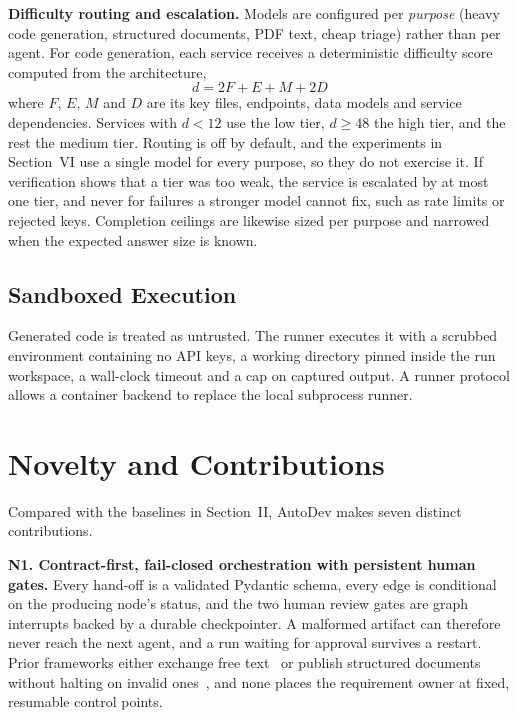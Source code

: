 \documentclass[conference,letterpaper]{IEEEtran}
\begin{document}
\textbf{Difficulty routing and escalation.} Models are configured per
\emph{purpose} (heavy code generation, structured documents, PDF text, cheap
triage) rather than per agent. For code generation, each service receives a
deterministic difficulty score computed from the architecture,
\begin{equation}
d = 2F + E + M + 2D
\label{eq:difficulty}
\end{equation}
where $F$, $E$, $M$ and $D$ are its key files, endpoints, data models and service
dependencies. Services with $d<12$ use the low tier, $d\ge48$ the high tier,
and the rest the medium tier. Routing is off by default, and the experiments in
Section~VI use a single model for every purpose, so they do not exercise it. If verification shows that a tier was too weak, the
service is escalated by at most one tier, and never for failures a stronger model
cannot fix, such as rate limits or rejected keys. Completion ceilings are likewise
sized per purpose and narrowed when the expected answer size is known.

\subsection{Sandboxed Execution}
Generated code is treated as untrusted. The runner executes it with a scrubbed
environment containing no API keys, a working directory pinned inside the run
workspace, a wall-clock timeout and a cap on captured output. A runner protocol
allows a container backend to replace the local subprocess runner.

\section{Novelty and Contributions}

Compared with the baselines in Section~II, AutoDev makes seven distinct
contributions.

\textbf{N1. Contract-first, fail-closed orchestration with persistent human
gates.} Every hand-off is a validated Pydantic schema, every edge is conditional
on the producing node's status, and the two human review gates are graph
interrupts backed by a durable checkpointer. A malformed artifact can therefore
never reach the next agent, and a run waiting for approval survives a restart.
Prior frameworks either exchange free text~\cite{qian2024chatdev} or publish
structured documents without halting on invalid ones~\cite{hong2024metagpt}, and
none places the requirement owner at fixed, resumable control points.
\end{document}
